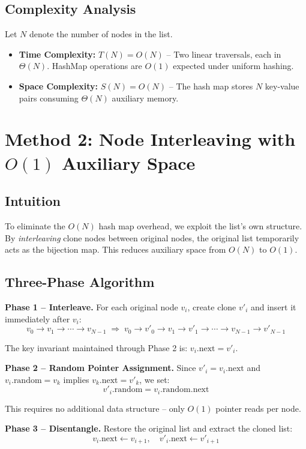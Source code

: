 \documentclass[10pt,journal,compsoc]{IEEEtran}
\begin{document}
\subsection{Complexity Analysis}

Let $N$ denote the number of nodes in the list.
\begin{itemize}
    \item \textbf{Time Complexity:} $T(N) = O(N)$ -- Two linear traversals, each in $\Theta(N)$. HashMap operations are $O(1)$ expected under uniform hashing.
    \item \textbf{Space Complexity:} $S(N) = O(N)$ -- The hash map stores $N$ key-value pairs consuming $\Theta(N)$ auxiliary memory.
\end{itemize}

\section{Method 2: Node Interleaving with $O(1)$ Auxiliary Space}
\subsection{Intuition}

To eliminate the $O(N)$ hash map overhead, we exploit the list's own structure. By \textit{interleaving} clone nodes between original nodes, the original list temporarily acts as the bijection map. This reduces auxiliary space from $O(N)$ to $O(1)$.

\subsection{Three-Phase Algorithm}

\textbf{Phase 1 -- Interleave.} For each original node $v_i$, create clone $v'_i$ and insert it immediately after $v_i$:
\[
v_0 \to v_1 \to \cdots \to v_{N-1}
\;\Longrightarrow\;
v_0 \to v'_0 \to v_1 \to v'_1 \to \cdots \to v_{N-1} \to v'_{N-1}
\]

The key invariant maintained through Phase 2 is: $v_i.\text{next} = v'_i$.

\textbf{Phase 2 -- Random Pointer Assignment.} Since $v'_i = v_i.\text{next}$ and $v_i.\text{random} = v_k$ implies $v_k.\text{next} = v'_k$, we set:
\[
v'_i.\text{random} = v_i.\text{random}.\text{next}
\]

This requires no additional data structure -- only $O(1)$ pointer reads per node.

\textbf{Phase 3 -- Disentangle.} Restore the original list and extract the cloned list:
\[
v_i.\text{next} \leftarrow v_{i+1}, \quad v'_i.\text{next} \leftarrow v'_{i+1}
\]
\end{document}
